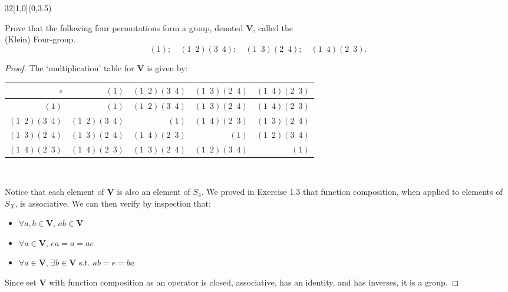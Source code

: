 \documentclass[12pt]{article}
\newenvironment{exercise}[2]{\begin{textblock}{32}[1,0](0,#2)\noindent#1\end{textblock}}{\vspace{1in}}
\begin{document}
\begin{exercise}{1.36}{3.5}
	{\noindent}Prove that the following four permutations form a group, denoted $\mathbf{V}$, called the \\(Klein) Four-group.
	\[(1);\quad(1\enspace2)(3\enspace4);\quad(1\enspace3)(2\enspace4);\quad(1\enspace4)(2\enspace3).\]
	\bigskip

	\begin{proof}
		The `multiplication' table for $\mathbf{V}$ is given by:
		\bigskip

		\setlength{\tabcolsep}{1em} %
		\renewcommand{\arraystretch}{1.25}%
		\begin{tabular}{r|rrrr}
			$\circ$                    & $(1)$                      & $(1\enspace2)(3\enspace4)$ & $(1\enspace3)(2\enspace4)$ & $(1\enspace4)(2\enspace3)$ \\ \hline
			$(1)$                      & $(1)$                      & $(1\enspace2)(3\enspace4)$ & $(1\enspace3)(2\enspace4)$ & $(1\enspace4)(2\enspace3)$ \\
			$(1\enspace2)(3\enspace4)$ & $(1\enspace2)(3\enspace4)$ & $(1)$                      & $(1\enspace4)(2\enspace3)$ & $(1\enspace3)(2\enspace4)$ \\
			$(1\enspace3)(2\enspace4)$ & $(1\enspace3)(2\enspace4)$ & $(1\enspace4)(2\enspace3)$ & $(1)$                      & $(1\enspace2)(3\enspace4)$ \\
			$(1\enspace4)(2\enspace3)$ & $(1\enspace4)(2\enspace3)$ & $(1\enspace3)(2\enspace4)$ & $(1\enspace2)(3\enspace4)$ & $(1)$                      \\
		\end{tabular} \\
	\bigskip

	{\noindent}Notice that each element of $\mathbf{V}$ is also an element of $S_4$. We proved in Exercise 1.3 that function composition, when applied to elements of $S_X$, is associative.
	We can then verify by inspection that:
	\begin{itemize}
		\item $\forall a,b\in\mathbf{V}$, $ab \in \mathbf{V}$
		\item $\forall a\in\mathbf{V}$, $ea=a=ae$ 
		\item $\forall a\in\mathbf{V}$, $\exists b\in\mathbf{V}$ s.t. $ab=e=ba$ \quad[Specifically, $b=a$; \textsc{iow}, every element of $\mathbf{V}$ is its own inverse.]
	\end{itemize}
	Since set $\mathbf{V}$ with function composition as an operator is closed, associative, has an identity, and has inverses, it is a group.
	\end{proof}
\end{exercise}
\end{document}
